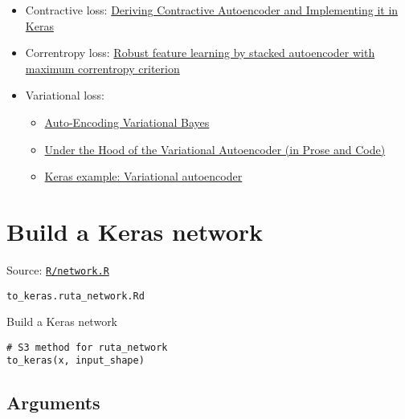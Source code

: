 \begin{itemize}
\tightlist
\item
  Contractive loss:
  \href{https://wiseodd.github.io/techblog/2016/12/05/contractive-autoencoder/}{Deriving
  Contractive Autoencoder and Implementing it in Keras}
\end{itemize}

\begin{itemize}
\tightlist
\item
  Correntropy loss:
  \href{https://ieeexplore.ieee.org/abstract/document/6854900/}{Robust
  feature learning by stacked autoencoder with maximum correntropy
  criterion}
\end{itemize}

\begin{itemize}
\item
  Variational loss:

  \begin{itemize}
  \item
    \href{https://arxiv.org/abs/1312.6114}{Auto-Encoding Variational
    Bayes}
  \item
    \href{http://blog.fastforwardlabs.com/2016/08/22/under-the-hood-of-the-variational-autoencoder-in.html}{Under
    the Hood of the Variational Autoencoder (in Prose and Code)}
  \item
    \href{https://keras.rstudio.com/articles/examples/variational_autoencoder.html}{Keras
    example: Variational autoencoder}
  \end{itemize}
\end{itemize}

\section{Build a Keras network}\label{build-a-keras-network}

Source:
\href{https://github.com/fdavidcl/ruta/blob/master/R/network.R}{\texttt{R/network.R}}

\texttt{to\_keras.ruta\_network.Rd}

Build a Keras network

\begin{verbatim}
# S3 method for ruta_network
to_keras(x, input_shape)
\end{verbatim}

\hypertarget{arguments}{\subsection{\texorpdfstring{\protect\hyperlink{arguments}{}Arguments}{Arguments}}\label{arguments}}

